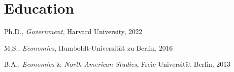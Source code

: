 \documentclass[letterpaper, 10pt]{article}
\newif\ifjobmarket
\renewenvironment{itemize}{
  \begin{list}{}{
    \setlength{\leftmargin}{0em}
  }
}{
  \end{list}
}
\begin{document}
\section*{Education}

\begin{itemize}
  \setlength\itemsep{0em}
	\item Ph.D., \emph{Government}, Harvard University, 2022
	\ifjobmarket\\
	\hspace*{0.8cm} Fields: Comparative Politics, Quantitative Methodology \\
	\hspace*{0.8cm} Dissertation: \emph{The Political Effects of Local Fiscal Shocks} \\
	\hspace*{0.8cm} Committee: Daniel Ziblatt, Torben Iversen, and Pia Raffler
	\fi
	\item M.S., \emph{Economics}, Humboldt-Universität zu Berlin, 2016
  \item B.A., \emph{Economics} \& \emph{North American Studies}, Freie Universität Berlin, 2013
\end{itemize}

\vspace*{-0.1cm}
\end{document}
